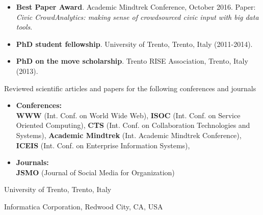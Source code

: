 
\begin{itemize}
	\item \textbf{Best Paper Award}. Academic Mindtrek Conference, October 2016. Paper: \textit{Civic CrowdAnalytics: making sense of crowdsourced civic input with big data tools}.
	\item \textbf{PhD student fellowship}. University of Trento, Trento, Italy (2011-2014).
	\item \textbf{PhD on the move scholarship}. Trento RISE Association, Trento, Italy (2013).
\end{itemize}


Reviewed scientific articles and papers for the following conferences and journals\\

\begin{itemize}
\item \textbf{Conferences:}\\
\textbf{WWW} (Int. Conf. on World Wide Web), \textbf{ISOC} (Int. Conf. on Service Oriented Computing),
\textbf{CTS} (Int. Conf. on Collaboration Technologies and Systems), \textbf{Academic Mindtrek} (Int. Academic Mindtrek Conference), \textbf{ICEIS} (Int. Conf. on Enterprise Information Systems), 

\item \textbf{Journals:}\\
\textbf{JSMO} (Journal of Social Media for Organization)
\end{itemize}



{University of Trento, Trento, Italy}

\divider

{Informatica Corporation, Redwood City, CA, USA}
